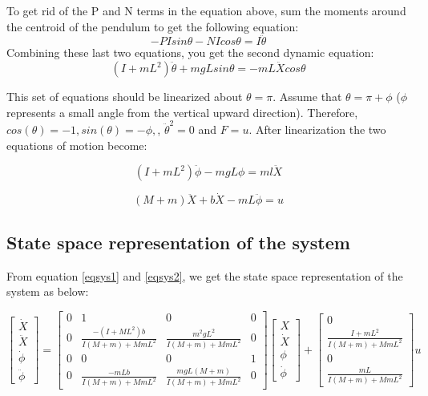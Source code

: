 \documentclass[12pt]{article}
\begin{document}
To get rid of the P and N terms in the equation above, sum the moments around the centroid of the pendulum to get the following equation:
\begin{equation}
-PIsin\theta-NIcos\theta=I\ddot{\theta}
\end{equation}
Combining these last two equations, you get the second dynamic equation:
\begin{equation}
(I+mL^2)\ddot{\theta}+mgLsin\theta=-mL\ddot{X}cos\theta
\end{equation}

 This set of equations should be linearized about $\theta = \pi$. Assume that $\theta = \pi + \phi$ ($\phi$ represents a small angle from the vertical upward direction). Therefore, $cos(\theta) = -1, sin(\theta) = -\phi,$, $\ddot{\theta}^2 = 0$ and $F=u$. After linearization the two equations of motion become:

\begin{equation}
(I+mL^2)\ddot{\phi}-mgL\phi=ml\ddot{X}
\label{eqsys1}
\end{equation}

\begin{equation}
(M+m)\ddot{X}+b\dot{X}-mL\ddot{\phi}=u
\label{eqsys2}
\end{equation}

\subsection{ State space representation of the system}
From equation \ref{eqsys1} and \ref{eqsys2}, we get the state space representation of the system as below:

\begin{equation}
\begin{bmatrix}
\dot{X}\\ \ddot{X}\\ \dot{\phi}\\ \ddot{\phi}
\end{bmatrix}
=
\begin{bmatrix}
0 & 1 & 0 & 0\\
0 & \frac{-(I+ML^2)b}{I(M+m)+MmL^2} & \frac{m^2gL^2}{I(M+m)+MmL^2} & 0\\
0 & 0 & 0 & 1\\
0 & \frac{-mLb}{I(M+m)+MmL^2} & \frac{mgL(M+m)}{I(M+m)+MmL^2} & 0
\end{bmatrix}
\begin{bmatrix}
X\\\dot{X}\\\phi\\\dot{\phi}
\end{bmatrix}
+
\begin{bmatrix}
0\\\frac{I+mL^2}{I(M+m)+MmL^2}\\0\\\frac{mL}{I(M+m)+MmL^2}
\end{bmatrix}
u
\end{equation}
\end{document}
